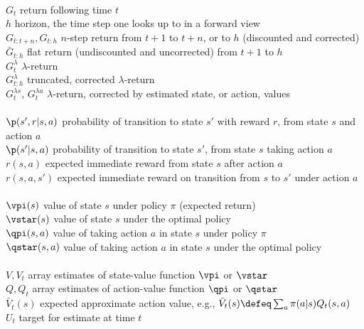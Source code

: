 \begin{tabbing}
\\
\>$G_t$               \> return following time $t$\\
\>$h$                 \> horizon, the time step one looks up to in a forward view\\
\>$G_{t:t+n}, G_{t:h}$\> $n$-step return from $t+1$ to $t+n$, or to $h$ (discounted and corrected) \\
\>$\bar G_{t:h}$      \> flat return (undiscounted and uncorrected) from $t+1$ to $h$\\
\>$G^\lambda_t$       \> $\lambda$-return\\
\>$G^\lambda_{t:h}$   \> truncated, corrected $\lambda$-return\\
\>$G^{\lambda s}_t$, $G^{\lambda a}_t$    \> $\lambda$-return, corrected by estimated state, or action, values \\
\\
\>$\p(s',r|s,a)$      \> probability of transition to state $s'$ with reward $r$, from state $s$ and action $a$\\
\>$\p(s'|s,a)$        \> probability of transition to state $s'$, from state $s$ taking action $a$\\
\>$r(s,a)$            \> expected immediate reward from state $s$ after action $a$\\
\>$r(s,a,s')$         \> expected immediate reward on transition from $s$ to $s'$ under action $a$\\
\\
\>$\vpi(s)$           \> value of state $s$ under policy $\pi$ (expected return)\\
\>$\vstar(s)$         \> value of state $s$ under the optimal policy \\
\>$\qpi(s,a)$         \> value of taking action $a$ in state $s$ under policy $\pi$\\
\>$\qstar(s,a)$       \> value of taking action $a$ in state $s$ under the optimal policy \\
\\
\>$V, V_t$            \> array estimates of state-value function $\vpi$ or $\vstar$\\
\>$Q, Q_t$            \> array estimates of action-value function $\qpi$ or $\qstar$\\
\>$\bar V_t(s)$       \> expected approximate action value, e.g., $\bar V_t(s)\defeq\sum_a\pi(a|s)Q_{t}(s,a)$\\
\>$U_t$               \> target for estimate at time $t$\\
\\

\end{tabbing}
